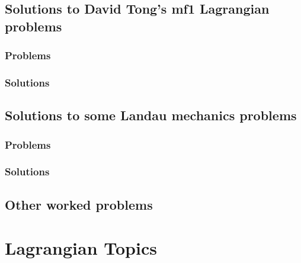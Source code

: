    \chapter{Solutions to David Tong's mf1 Lagrangian problems}
      \section{Problems}
         
      \section{Solutions}
         \shipoutAnswer
   \chapter{Solutions to some Landau mechanics problems}
      \section{Problems}
         
      \section{Solutions}
         \shipoutAnswer
   \chapter{Other worked problems}
      
         \shipoutAnswer

\part{Lagrangian Topics}
   
   
   
   
   
   

